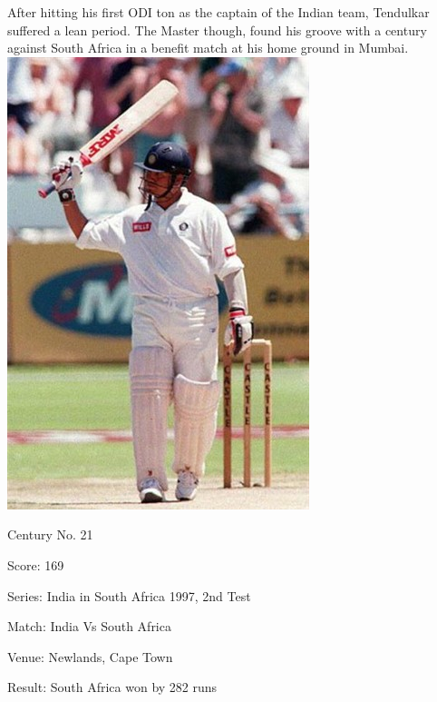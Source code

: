 \documentclass[11pt, a4paper]{article}
\begin{document}
After hitting his first ODI ton as the captain of the Indian team, Tendulkar suffered a lean period. The Master though, found his groove with a century against South Africa in a benefit match at his home ground in Mumbai.
\newpage
\includegraphics[height=0.75\textheight]{pics/21.jpg}

Century No. 21 

Score: 169 

Series: India in South Africa 1997, 2nd Test 

Match: India Vs South Africa 

Venue: Newlands, Cape Town 

Result: South Africa won by 282 runs 
\end{document}
